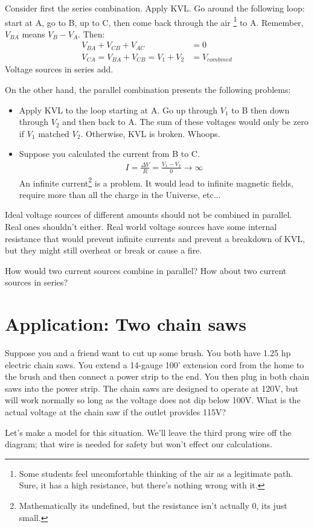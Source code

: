 Consider first the series combination. Apply KVL. Go around the following loop: start at A, go to B, up to C, then come back through the air \footnote{Some students feel uncomfortable thinking of the air as a legitimate path. Sure, it has a high resistance, but there's nothing wrong with it.} to A. Remember, $V_{BA}$ means $V_B-V_A$. Then:
\begin{align*}
V_{BA}+V_{CB}+V_{AC}&=0\\
V_{CA}=V_{BA}+V_{CB} =V_1+V_2 &=V_{combined}
\end{align*}
Voltage sources in series add.\par

On the other hand, the parallel combination presents the following problems:
\begin{itemize}
\item Apply KVL to the loop starting at A. Go up through $V_1$ to B then down through $V_2$ and then back to A. The sum of these voltages would only be zero if $V_1$ matched $V_2$. Otherwise, KVL is broken. Whoops.
\item Suppose you calculated the current from B to C. 
\begin{align*}
I=\frac{\Delta V}{R}=\frac{V_1-V_2}{0} \rightarrow \infty
\end{align*}
An infinite current\footnote{Mathematically its undefined, but the resistance isn't actually 0, its just small.} is a problem. It would lead to infinite magnetic fields, require more than all the charge in the Universe, etc...
\end{itemize}
Ideal voltage sources of different amounts should not be combined in parallel. Real ones shouldn't either. Real world voltage sources have some internal resistance that would prevent infinite currents and prevent a breakdown of KVL, but they might still overheat or break or cause a fire.

\begin{clevel}
How would two current sources combine in parallel? How about two current sources in series?
\end{clevel}

\section{Application: Two chain saws}
Suppose you and a friend want to cut up some brush. You both have 1.25 hp electric chain saws. You extend a 14-gauge 100' extension cord from the home to the brush and then connect a power strip to the end. You then plug in both chain saws into the power strip. The chain saws are designed to operate at 120V, but will work normally so long as the voltage does not dip below 100V. What is the actual voltage at the chain saw if the outlet provides 115V?
\par
Let's make a model for this situation. We'll leave the third prong wire off the diagram; that wire is needed for safety but won't effect our calculations.\par

